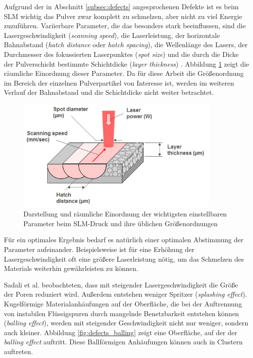 		Aufgrund der in Abschnitt \ref{subsec:defects} angesprochenen Defekte ist es beim
		SLM wichtig das Pulver zwar komplett zu schmelzen, aber nicht zu viel Energie zuzuführen.
		Variierbare Parameter, die das besonders stark beeinflussen, sind die Lasergeschwindigkeit
		(\emph{scanning speed}), die Laserleistung, der horizontale Bahnabstand
		(\emph{hatch distance} oder \emph{hatch spacing}), die Wellenlänge des Lasers, der
		Durchmesser des fokussierten Laserpunktes (\emph{spot size}) und die durch die Dicke der
		Pulverschicht bestimmte  Schichtdicke (\emph{layer thickness}) \cite{sadali2020influence}.
		Abbildung \ref{fig:slm_parameters} zeigt die räumliche Einordnung dieser Parameter. Da für
		diese Arbeit die Größenordnung im Bereich der einzelnen Pulverpartikel von Interesse ist,
		werden im weiteren Verlauf der Bahnabstand und die Schichtdicke nicht weiter betrachtet.

		\begin{figure}[!ht]
			\centering
			\includegraphics[width=0.9\textwidth]{chapter/main/theory/img/slm_parameters.jpg}
			\caption{Darstellung und räumliche Einordnung der wichtigsten einstellbaren Parameter
			beim SLM-Druck und ihre üblichen Größenordnungen \cite{saunders2017x}}
			\label{fig:slm_parameters}
		\end{figure}

		Für ein optimales Ergebnis bedarf es natürlich einer optimalen Abstimmung der Parameter
		aufeinander. Beispielsweise ist für eine Erhöhung der Lasergeschwindigkeit oft eine
		größere Laserleistung nötig, um das Schmelzen des Materials weiterhin gewährleisten
		zu können.

		Sadali et al. beobachteten, dass mit steigender Lasergeschwindigkeit die Größe der Poren
		reduziert wird. Außerdem entstehen weniger Spritzer (\emph{splashing effect}).
		Kugelförmige Materialanhäufungen auf der Oberfläche, die bei der Auftrennung von
		instabilen Flüssigspuren durch mangelnde Benetzbarkeit entstehen können
		(\emph{balling effect}), werden mit steigender Geschwindigkeit nicht nur weniger, sondern
		auch kleiner. Abbildung \ref{fig:defects_balling} zeigt eine Oberfläche, auf der der
		\emph{balling effect} auftritt. Diese Ballförmigen Anhäufungen können auch in Clustern
		auftreten.

